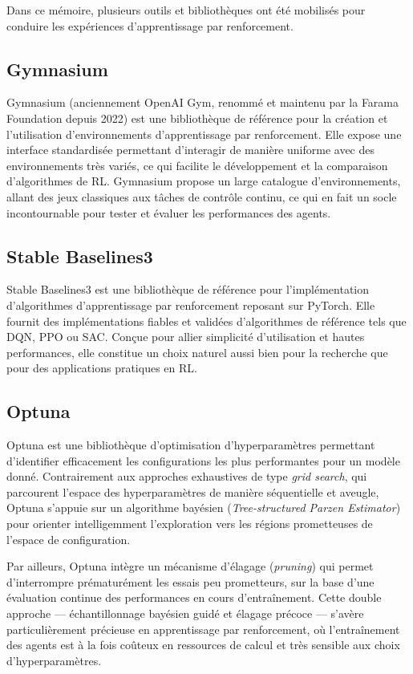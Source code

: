 Dans ce mémoire, plusieurs outils et bibliothèques ont été mobilisés pour conduire les expériences d'apprentissage par renforcement.

\subsection{Gymnasium}
Gymnasium (anciennement OpenAI Gym, renommé et maintenu par la Farama Foundation depuis 2022) est une bibliothèque de référence pour la création et l'utilisation d'environnements d'apprentissage par renforcement. Elle expose une interface standardisée permettant d'interagir de manière uniforme avec des environnements très variés, ce qui facilite le développement et la comparaison d'algorithmes de RL. Gymnasium propose un large catalogue d'environnements, allant des jeux classiques aux tâches de contrôle continu, ce qui en fait un socle incontournable pour tester et évaluer les performances des agents. \parencite{GymnasiumDocumentation}

\subsection{Stable Baselines3}
\label{sec:sb3}
Stable Baselines3 est une bibliothèque de référence pour l'implémentation d'algorithmes d'apprentissage par renforcement reposant sur PyTorch. Elle fournit des implémentations fiables et validées d'algorithmes de référence tels que DQN, PPO ou SAC. Conçue pour allier simplicité d'utilisation et hautes performances, elle constitue un choix naturel aussi bien pour la recherche que pour des applications pratiques en RL. \parencite{antoninraffinDLRRMStablebaselines3V2802026}

\subsection{Optuna}

Optuna est une bibliothèque d'optimisation d'hyperparamètres permettant d'identifier efficacement les configurations les plus performantes pour un modèle donné. Contrairement aux approches exhaustives de type \textit{grid search}, qui parcourent l'espace des hyperparamètres de manière séquentielle et aveugle, Optuna s'appuie sur un algorithme bayésien (\textit{Tree-structured Parzen Estimator}) pour orienter intelligemment l'exploration vers les régions prometteuses de l'espace de configuration. 

Par ailleurs, Optuna intègre un mécanisme d'élagage (\textit{pruning}) qui permet d'interrompre prématurément les essais peu prometteurs, sur la base d'une évaluation continue des performances en cours d'entraînement. Cette double approche — échantillonnage bayésien guidé et élagage précoce — s'avère particulièrement précieuse en apprentissage par renforcement, où l'entraînement des agents est à la fois coûteux en ressources de calcul et très sensible aux choix d'hyperparamètres. \parencite{akibaOptunaNextgenerationHyperparameter2019}

